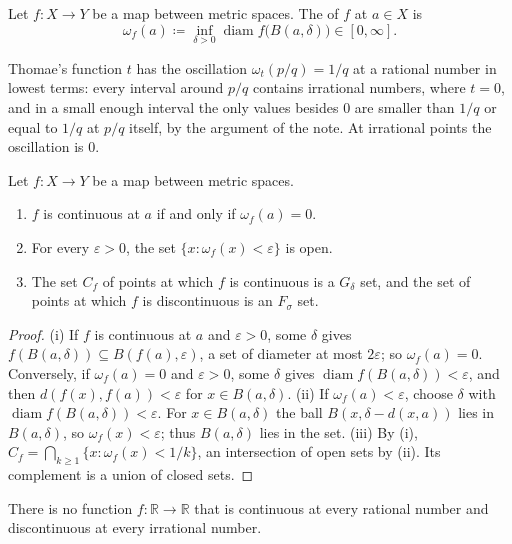 \begin{definition}[Oscillation]
\label{def:oscillation}
Let $f\colon X\to Y$ be a map between metric spaces. The  of $f$ at $a\in X$ is
\[
\omega_f(a)\coloneqq\inf_{\delta>0}\operatorname{diam}f\bigl(B(a,\delta)\bigr)\in[0,\infty].
\]
\end{definition}

Thomae's function $t$ has the oscillation $\omega_t(p/q)=1/q$ at a rational number in lowest terms: every interval around $p/q$ contains irrational numbers, where $t=0$, and in a small enough interval the only values besides $0$ are smaller than $1/q$ or equal to $1/q$ at $p/q$ itself, by the argument of the note. At irrational points the oscillation is $0$.

\begin{proposition}
\label{prop:oscillation}
Let $f\colon X\to Y$ be a map between metric spaces.
\begin{enumerate}
\item $f$ is continuous at $a$ if and only if $\omega_f(a)=0$.
\item For every $\varepsilon>0$, the set $\{x: \omega_f(x)<\varepsilon\}$ is open.
\item The set $C_f$ of points at which $f$ is continuous is a $G_\delta$ set, and the set of points at which $f$ is discontinuous is an $F_\sigma$ set.
\end{enumerate}
\end{proposition}

\begin{proof}
(i) If $f$ is continuous at $a$ and $\varepsilon>0$, some $\delta$ gives $f(B(a,\delta))\subseteq B(f(a),\varepsilon)$, a set of diameter at most $2\varepsilon$; so $\omega_f(a)=0$. Conversely, if $\omega_f(a)=0$ and $\varepsilon>0$, some $\delta$ gives $\operatorname{diam}f(B(a,\delta))<\varepsilon$, and then $d(f(x),f(a))<\varepsilon$ for $x\in B(a,\delta)$. (ii) If $\omega_f(a)<\varepsilon$, choose $\delta$ with $\operatorname{diam}f(B(a,\delta))<\varepsilon$. For $x\in B(a,\delta)$ the ball $B(x,\delta-d(x,a))$ lies in $B(a,\delta)$, so $\omega_f(x)<\varepsilon$; thus $B(a,\delta)$ lies in the set. (iii) By (i), $C_f=\bigcap_{k\ge1}\{x: \omega_f(x)<1/k\}$, an intersection of open sets by (ii). Its complement is a union of closed sets.
\end{proof}

\begin{theorem}
\label{thm:no-rational-continuity}
There is no function $f\colon\mathbb R\to\mathbb R$ that is continuous at every rational number and discontinuous at every irrational number.
\end{theorem}

